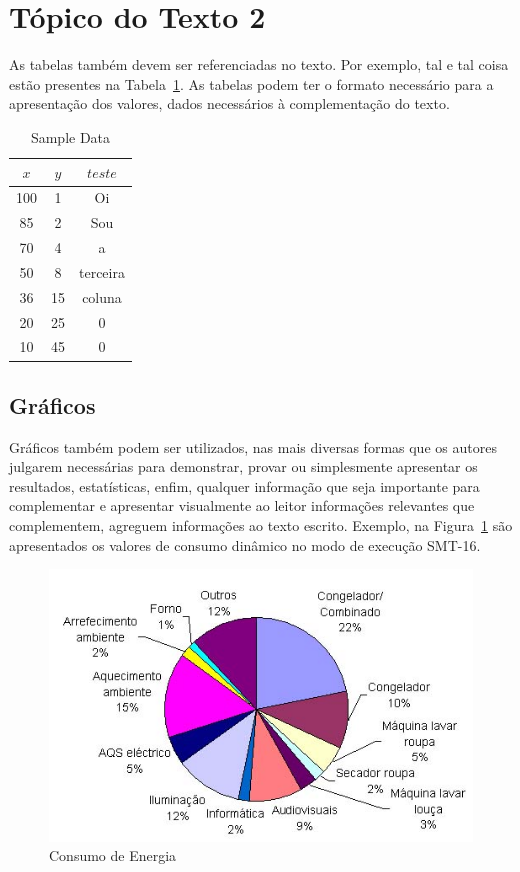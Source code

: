 \documentclass[times, 10pt,twocolumn]{article}
\begin{document}
\section{Tópico do Texto 2} \label{sec_topico_texto_2}

As tabelas também devem ser referenciadas no texto. Por exemplo, tal e tal coisa estão presentes na Tabela~{\ref{tab:tabela-001}}. As tabelas podem ter o formato necessário para a apresentação dos valores, dados necessários à complementação do texto.


\begin{table}[h]
\caption {Sample Data}
\begin{center}
\begin{tabular}{|c|c|c|} \hline
$x$ & $y$ & $teste$  \\
\hline \hline
100 & 1 & Oi \\
\hline
85 & 2 & Sou  \\
\hline
70 & 4 & a  \\
\hline
50 & 8 & terceira  \\
\hline
36 & 15 & coluna  \\
\hline
20 & 25 & 0  \\
\hline
10 & 45 & 0  \\
\hline
\end{tabular}
\end{center}
\label{tab:tabela-001}
\end{table}


\subsection{Gráficos}
Gráficos também podem ser utilizados, nas mais diversas formas que os autores julgarem necessárias para demonstrar, provar ou simplesmente apresentar os resultados, estatísticas, enfim, qualquer informação que seja importante para complementar e apresentar visualmente ao leitor informações relevantes que complementem, agreguem informações ao texto escrito. Exemplo, na Figura~{\ref{fig:figura-002}} são apresentados os valores de consumo dinâmico no modo de execução SMT-16.

\begin{figure}[*H]
    \centering
    \includegraphics[width=.5\textwidth]{figuras/consumo.jpg}
    \caption{Consumo de Energia}
    \label{fig:figura-002}
\end{figure}
\end{document}
